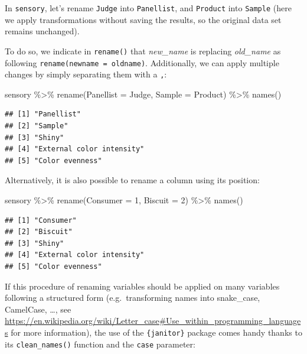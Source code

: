 \documentclass[
]{krantz}
\makeatletter
\newenvironment{Shaded}{\begin{snugshade}}{\end{snugshade}}
\newcommand{\AttributeTok}[1]{\textcolor[rgb]{0.61,0.61,0.61}{#1}}
\newcommand{\DecValTok}[1]{\textcolor[rgb]{0.06,0.06,0.06}{#1}}
\newcommand{\FunctionTok}[1]{\textcolor[rgb]{0,0,0}{#1}}
\newcommand{\NormalTok}[1]{#1}
\newcommand{\SpecialCharTok}[1]{\textcolor[rgb]{0,0,0}{#1}}
\newenvironment{kframe}{%
\medskip{}
\setlength{\fboxsep}{.8em}
 \def\at@end@of@kframe{}%
 \ifinner\ifhmode%
  \def\at@end@of@kframe{\end{minipage}}%
  \begin{minipage}{\columnwidth}%
 \fi\fi%
 \def\FrameCommand##1{\hskip\@totalleftmargin \hskip-\fboxsep
 \colorbox{shadecolor}{##1}\hskip-\fboxsep
     \hskip-\linewidth \hskip-\@totalleftmargin \hskip\columnwidth}%
 \MakeFramed {\advance\hsize-\width
   \@totalleftmargin\z@ \linewidth\hsize
   \@setminipage}}%
 {\par\unskip\endMakeFramed%
 \at@end@of@kframe}
\renewenvironment{Shaded}{\begin{kframe}}{\end{kframe}}
\makeatother
\begin{document}
In \texttt{sensory}, let's rename \texttt{Judge} into \texttt{Panellist}, and \texttt{Product} into \texttt{Sample} (here we apply transformations without saving the results, so the original data set remains unchanged).

To do so, we indicate in \texttt{rename()} that \emph{new\_name} is replacing \emph{old\_name} as following \texttt{rename(newname\ =\ oldname)}. Additionally, we can apply multiple changes by simply separating them with a \texttt{,}:

\begin{Shaded}
\begin{Highlighting}[]
\NormalTok{sensory }\SpecialCharTok{\%\textgreater{}\%}
  \FunctionTok{rename}\NormalTok{(}\AttributeTok{Panellist =}\NormalTok{ Judge, }\AttributeTok{Sample =}\NormalTok{ Product) }\SpecialCharTok{\%\textgreater{}\%}
  \FunctionTok{names}\NormalTok{()}
\end{Highlighting}
\end{Shaded}

\begin{verbatim}
## [1] "Panellist"               
## [2] "Sample"                  
## [3] "Shiny"                   
## [4] "External color intensity"
## [5] "Color evenness"
\end{verbatim}

Alternatively, it is also possible to rename a column using its position:

\begin{Shaded}
\begin{Highlighting}[]
\NormalTok{sensory }\SpecialCharTok{\%\textgreater{}\%}
  \FunctionTok{rename}\NormalTok{(}\AttributeTok{Consumer =} \DecValTok{1}\NormalTok{, }\AttributeTok{Biscuit =} \DecValTok{2}\NormalTok{) }\SpecialCharTok{\%\textgreater{}\%}
  \FunctionTok{names}\NormalTok{()}
\end{Highlighting}
\end{Shaded}

\begin{verbatim}
## [1] "Consumer"                
## [2] "Biscuit"                 
## [3] "Shiny"                   
## [4] "External color intensity"
## [5] "Color evenness"
\end{verbatim}

If this procedure of renaming variables should be applied on many variables following a structured form (e.g.~transforming names into snake\_case, CamelCase, \ldots, see \url{https://en.wikipedia.org/wiki/Letter_case\#Use_within_programming_languages} for more information), the use of the \texttt{\{janitor\}} package comes handy thanks to its \texttt{clean\_names()} function and the \texttt{case} parameter:
\end{document}
